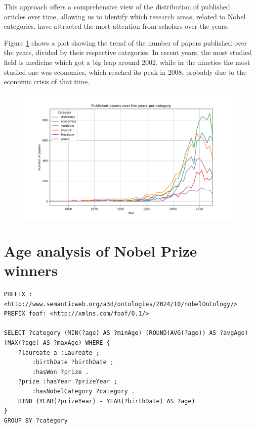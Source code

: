 \documentclass{article}
\begin{document}
\newpage

\noindent This approach offers a comprehensive view of the distribution of published articles over time, allowing us to identify which research areas, related
to Nobel categories, have attracted the most attention from scholars over the years.

\noindent Figure \ref{fig:papersPerCategory} shows a plot showing the trend of the number of papers published over the years, divided by their respective categories.
In recent years, the most studied field is medicine which got a big leap around 2002, while in the nineties the most studied one was economics, which
reached its peak in 2008, probably due to the economic crisis of that time.
\begin{figure}[ht]
	\label{fig:papersPerCategory}
	\centering
	\includegraphics[width=\textwidth]{../queries/plots/papersPerCategory.png}
\end{figure}

\newpage

\section{Age analysis of Nobel Prize winners} \label{winners age}
\begin{lstlisting}
PREFIX : <http://www.semanticweb.org/a3d/ontologies/2024/10/nobelOntology/>
PREFIX foaf: <http://xmlns.com/foaf/0.1/>

SELECT ?category (MIN(?age) AS ?minAge) (ROUND(AVG(?age)) AS ?avgAge) (MAX(?age) AS ?maxAge) WHERE {
    ?laureate a :Laureate ;
        :birthDate ?birthDate ;
        :hasWon ?prize .
    ?prize :hasYear ?prizeYear ;
        :hasNobelCategory ?category .
    BIND (YEAR(?prizeYear) - YEAR(?birthDate) AS ?age)
}
GROUP BY ?category
\end{lstlisting}
\end{document}
